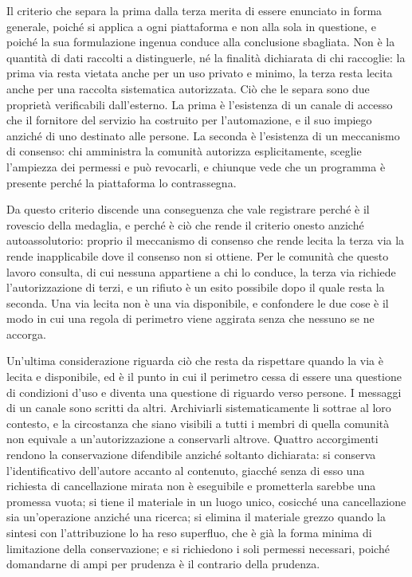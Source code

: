Il criterio che separa la prima dalla terza merita di essere enunciato in forma generale, poiché si applica a ogni piattaforma e non alla sola in questione, e poiché la sua formulazione ingenua conduce alla conclusione sbagliata. Non è la quantità di dati raccolti a distinguerle, né la finalità dichiarata di chi raccoglie: la prima via resta vietata anche per un uso privato e minimo, la terza resta lecita anche per una raccolta sistematica autorizzata. Ciò che le separa sono due proprietà verificabili dall'esterno. La prima è l'esistenza di un canale di accesso che il fornitore del servizio ha costruito per l'automazione, e il suo impiego anziché di uno destinato alle persone. La seconda è l'esistenza di un meccanismo di consenso: chi amministra la comunità autorizza esplicitamente, sceglie l'ampiezza dei permessi e può revocarli, e chiunque vede che un programma è presente perché la piattaforma lo contrassegna.

Da questo criterio discende una conseguenza che vale registrare perché è il rovescio della medaglia, e perché è ciò che rende il criterio onesto anziché autoassolutorio: proprio il meccanismo di consenso che rende lecita la terza via la rende inapplicabile dove il consenso non si ottiene. Per le comunità che questo lavoro consulta, di cui nessuna appartiene a chi lo conduce, la terza via richiede l'autorizzazione di terzi, e un rifiuto è un esito possibile dopo il quale resta la seconda. Una via lecita non è una via disponibile, e confondere le due cose è il modo in cui una regola di perimetro viene aggirata senza che nessuno se ne accorga.

Un'ultima considerazione riguarda ciò che resta da rispettare quando la via è lecita e disponibile, ed è il punto in cui il perimetro cessa di essere una questione di condizioni d'uso e diventa una questione di riguardo verso persone. I messaggi di un canale sono scritti da altri. Archiviarli sistematicamente li sottrae al loro contesto, e la circostanza che siano visibili a tutti i membri di quella comunità non equivale a un'autorizzazione a conservarli altrove. Quattro accorgimenti rendono la conservazione difendibile anziché soltanto dichiarata: si conserva l'identificativo dell'autore accanto al contenuto, giacché senza di esso una richiesta di cancellazione mirata non è eseguibile e prometterla sarebbe una promessa vuota; si tiene il materiale in un luogo unico, cosicché una cancellazione sia un'operazione anziché una ricerca; si elimina il materiale grezzo quando la sintesi con l'attribuzione lo ha reso superfluo, che è già la forma minima di limitazione della conservazione; e si richiedono i soli permessi necessari, poiché domandarne di ampi per prudenza è il contrario della prudenza.
